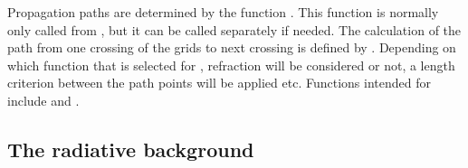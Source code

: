 Propagation paths are determined by the function .
This function is normally only called from , but it
can be called separately if needed. The calculation of the path from
one crossing of the grids to next crossing is defined by
. Depending on which function that is
selected for , refraction will be
considered or not, a length criterion between the path points will be
applied etc. Functions intended for 
include  and
.


\subsection{The radiative background}
\label{sec:fm_defs:rad_bkgr}

